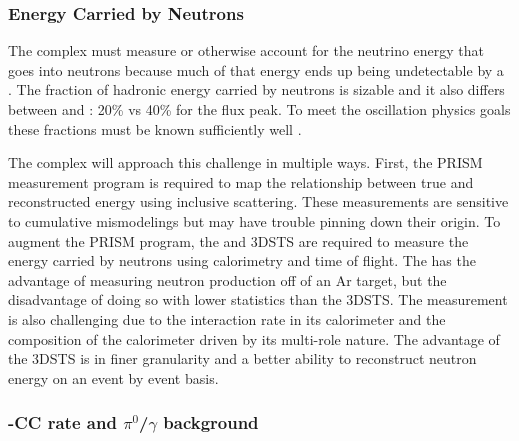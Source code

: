 \subsubsection{Energy Carried by Neutrons}

The   complex must measure or otherwise account for the neutrino energy that goes into neutrons because much of that energy ends up being undetectable by a . The fraction of hadronic energy carried by neutrons is sizable and it also differs between \numu and \anumu: 20\% vs 40\% for the flux peak. To meet the oscillation physics goals these fractions must be known sufficiently well .

The complex will approach this challenge in multiple ways. First, the PRISM measurement program is required to map the relationship between true and reconstructed energy using inclusive  scattering. These measurements are sensitive to cumulative mismodelings but may have trouble pinning down their origin. To augment the PRISM program, the  and 3DSTS are required to measure the energy carried by neutrons using calorimetry and time of flight.  The  has the advantage of measuring neutron production off of an Ar target, but the disadvantage of doing so with lower statistics than the 3DSTS. The  measurement is also challenging due to the interaction rate in its calorimeter and the composition of the calorimeter driven by its multi-role nature. The advantage of the 3DSTS is in finer granularity and a better ability to reconstruct neutron energy on an event by event basis.



%







\subsubsection{\nue-CC rate and $\pi^0$/$\gamma$ background}

